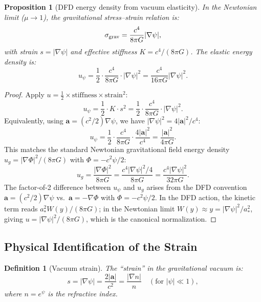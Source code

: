 \documentclass[11pt]{article}
\newtheorem{proposition}[theorem]{Proposition}
\newtheorem{definition}[theorem]{Definition}
\newcommand{\va}{\mathbf{a}}
\begin{document}
\begin{proposition}[DFD energy density from vacuum elasticity]
In the Newtonian limit ($\mu \to 1$), the gravitational stress--strain relation is:
\begin{equation}
\sigma_{\rm grav} = \frac{c^4}{8\pi G}|\nabla\psi|,
\end{equation}
with strain $s = |\nabla\psi|$ and effective stiffness $K = c^4/(8\pi G)$.
The elastic energy density is:
\begin{equation}
\boxed{
u_\psi = \frac{1}{2}\cdot\frac{c^4}{8\pi G}\cdot|\nabla\psi|^2
= \frac{c^4}{16\pi G}|\nabla\psi|^2.
}
\label{eq:energy-density}
\end{equation}
\end{proposition}

\begin{proof}
Apply $u = \frac{1}{2}\times\text{stiffness}\times\text{strain}^2$:
\begin{equation}
u_\psi = \frac{1}{2}\cdot K\cdot s^2 = \frac{1}{2}\cdot\frac{c^4}{8\pi G}\cdot|\nabla\psi|^2.
\end{equation}
Equivalently, using $\va = (c^2/2)\nabla\psi$, we have $|\nabla\psi|^2 = 4|\va|^2/c^4$:
\begin{equation}
u_\psi = \frac{1}{2}\cdot\frac{c^4}{8\pi G}\cdot\frac{4|\va|^2}{c^4}
= \frac{|\va|^2}{4\pi G}.
\end{equation}
This matches the standard Newtonian gravitational field energy density
$u_g = |\nabla\Phi|^2/(8\pi G)$ with $\Phi = -c^2\psi/2$:
\begin{equation}
u_g = \frac{|\nabla\Phi|^2}{8\pi G} = \frac{c^4|\nabla\psi|^2/4}{8\pi G}
= \frac{c^4|\nabla\psi|^2}{32\pi G}.
\end{equation}
The factor-of-2 difference between $u_\psi$ and $u_g$ arises from
the DFD convention $\va = (c^2/2)\nabla\psi$ vs.\ $\va = -\nabla\Phi$
with $\Phi = -c^2\psi/2$.  In the DFD action, the kinetic term reads
$a_*^2 W(y)/(8\pi G)$; in the Newtonian limit $W(y) \approx y = |\nabla\psi|^2/a_*^2$,
giving $u = |\nabla\psi|^2/(8\pi G)$, which is the canonical normalization.
\end{proof}

\subsection{Physical Identification of the Strain}

\begin{definition}[Vacuum strain]
The ``strain'' in the gravitational vacuum is:
\begin{equation}
s = |\nabla\psi| = \frac{2|\va|}{c^2} = \frac{|\nabla n|}{n} \quad (\text{for } |\psi| \ll 1),
\end{equation}
where $n = e^\psi$ is the refractive index.
\end{definition}
\end{document}

